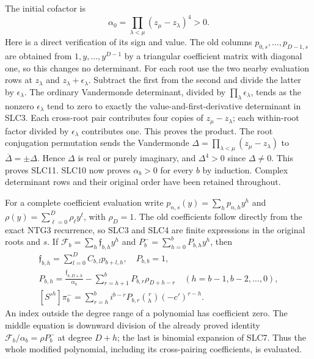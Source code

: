 \documentclass[11pt,a4paper]{article}
\begin{document}
The initial cofactor is
\[
       \alpha_0=\prod_{\lambda<\mu}(z_\mu-z_\lambda)^4>0.
                                                               \tag{SLC11}
\]
Here is a direct verification of its sign and value.
The old columns $p_{0,s},\ldots,p_{D-1,s}$ are obtained
from $1,y,\ldots,y^{D-1}$ by a triangular coefficient
matrix with diagonal one, so this changes no determinant.
For each root use the two nearby evaluation rows at
$z_\lambda$ and $z_\lambda+\epsilon_\lambda$.
Subtract the first from the second and divide the latter
by $\epsilon_\lambda$. The ordinary Vandermonde determinant,
divided by $\prod_\lambda\epsilon_\lambda$, tends as the
nonzero $\epsilon_\lambda$ tend to zero to exactly the
value-and-first-derivative determinant in SLC3. Each
cross-root pair contributes four copies of
$z_\mu-z_\lambda$; each within-root factor divided by
$\epsilon_\lambda$ contributes one. This proves the product.
The root conjugation permutation sends the Vandermonde
$\Delta=\prod_{\lambda<\mu}(z_\mu-z_\lambda)$ to
$\overline\Delta=\pm\Delta$. Hence $\Delta$ is real or
purely imaginary, and $\Delta^4>0$ since $\Delta\ne0$.
This proves SLC11. SLC10 now proves $\alpha_b>0$ for
every $b$ by induction. Complex determinant rows and
their original order have been retained throughout.

For a complete coefficient evaluation write
$p_{n,s}(y)=\sum_h p_{n,h}y^h$ and
$\rho(y)=\sum_{\ell=0}^{D}\rho_\ell y^\ell$, with
$\rho_D=1$. The old coefficients follow directly from
the exact NTG3 recurrence, so SLC3 and SLC4 are finite
expressions in the original roots and $s$.
If $\mathcal F_b=\sum_h \mathfrak f_{b,h}y^h$ and
$P_b^-=\sum_{h=0}^{b}P_{b,h}y^h$, then
\[
\begin{gathered}
 \mathfrak f_{b,h}=\sum_{l=0}^{D}C_{b,l}p_{b+l,h},\quad P_{b,b}=1,\\
 P_{b,h}=\frac{\mathfrak f_{b,D+h}}{\alpha_b}
             -\sum_{r=h+1}^{b}P_{b,r}\rho_{D+h-r}
              \quad(h=b-1,b-2,\ldots,0),\\
 [S'^h]\pi_b^-=
       \sum_{r=h}^{b}i^{b-r}P_{b,r}\binom rh(-c')^{r-h}.
\end{gathered}                                                    \tag{SLC12}
\]
An index outside the degree range of a polynomial has
coefficient zero. The middle equation is downward
division of the already proved identity $\mathcal F_b/\alpha_b
=\rho P_b^-$ at degree $D+h$; the last is binomial
expansion of SLC7. Thus the whole modified polynomial,
including its cross-pairing coefficients, is evaluated.
\end{document}
